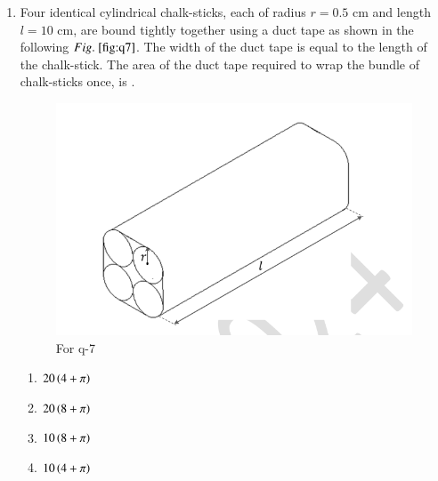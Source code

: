 \documentclass[journal,12pt,onecolumn]{IEEEtran}
\theoremstyle{remark}
\begin{document}
\begin{enumerate}
\item Four identical cylindrical chalk-sticks, each of radius $r=0.5$ cm and length $l=10$ cm, are bound tightly together using a duct tape as shown in the following $\figref{fig:q7}$. The width of the duct tape is equal to the length of the chalk-stick. The area  of the duct tape required to wrap the bundle of chalk-sticks once, is \underline{\hspace{2cm}}.
\begin{figure}[H]
    \centering
    \includegraphics[width=0.5\columnwidth]{q7.png}
    \caption{For q-7}
    \label{fig:q7}
\end{figure}
\hfill{}
\begin{multicols}{2}
\begin{enumerate}
    \item $20\left(4+\pi\right)$
    \item $20\left(8+\pi\right)$
    \item $10\left(8+\pi\right)$
    \item $10\left(4+\pi\right)$
\end{enumerate}
\end{multicols}


\end{enumerate}
\end{document}
